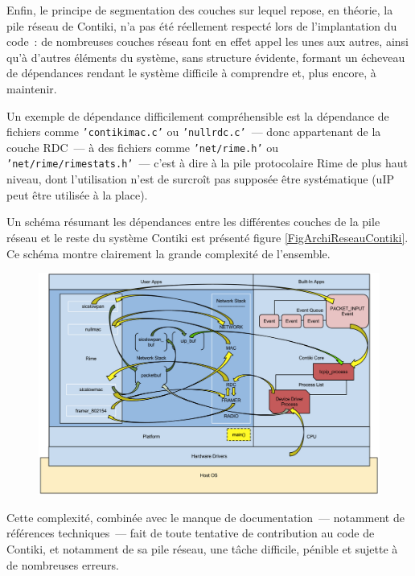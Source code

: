 Enfin, le principe de segmentation des couches sur lequel repose, en
théorie, la pile réseau de Contiki, n'a pas été réellement respecté
lors de l'implantation du code~: de nombreuses couches réseau font en
effet appel les unes aux autres, ainsi qu'à d'autres éléments du système,
sans structure évidente, formant un écheveau de dépendances rendant
le système difficile à comprendre et, plus encore, à maintenir.

Un exemple de dépendance difficilement compréhensible est la dépendance
de fichiers comme \texttt{'contikimac.c'} ou \texttt{'nullrdc.c'}~--- donc
appartenant de la couche RDC~--- à des fichiers comme \texttt{'net/rime.h'}
ou \texttt{'net/rime/rimestats.h'}~--- c'est à dire à la pile protocolaire
Rime de plus haut niveau, dont l'utilisation n'est de surcroît pas
supposée être systématique (uIP peut être utilisée à la place).

Un schéma résumant les dépendances entre les différentes couches de
la pile réseau et le reste du système Contiki est présenté figure
\vref{FigArchiReseauContiki}.
Ce schéma montre clairement la grande complexité de l'ensemble.

\begin{figure}[!hbt]
\centering
\includegraphics[width=12.5cm]{images/ch4-contiki-netstack.png}
\label{FigArchiReseauContiki}
\end{figure}

Cette complexité, combinée avec le manque de documentation~--- notamment
de références techniques~--- fait de toute tentative de contribution au code
de Contiki, et notamment de sa pile réseau, une tâche difficile, pénible
et sujette à de nombreuses erreurs.

